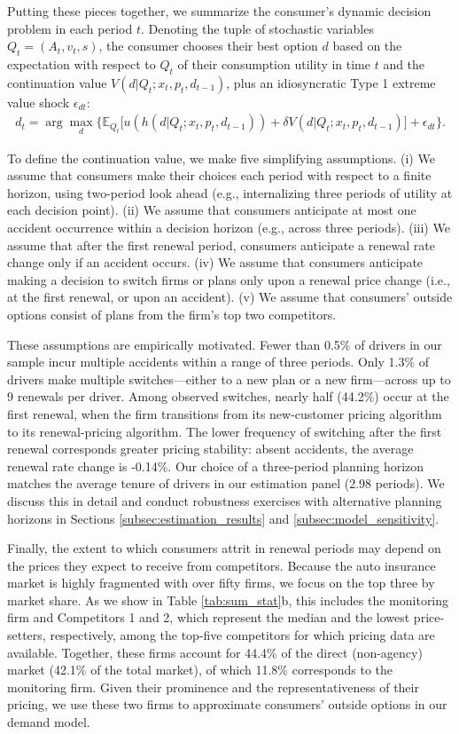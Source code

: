 Putting these pieces together, we summarize the consumer's dynamic decision problem in each period $t$. Denoting the tuple of stochastic variables $Q_t = (A_t, v_t, s)$, the consumer chooses their best option $d$ based on the expectation with respect to $Q_t$ of their consumption utility in time $t$ and the continuation value $V(d | Q_t; x_t, p_t, d_{t-1} )$, plus an idiosyncratic Type 1 extreme value shock $\epsilon_{dt}$:
%
\begin{align}\label{eq:dynamic_decision_model}
d_{t} =  \arg\max_{d}\Big\{\mathbb{E}_{Q_{t}}\Big[u(h(d|Q_t; x_t, p_t, d_{t-1})) + \delta V(d|Q_t; x_t, p_t, d_{t-1})\Big] + \epsilon_{dt}\Big\}.
\end{align}

To define the continuation value, we make five simplifying assumptions. (i)  We assume that consumers make their choices each period with respect to a finite horizon, using two-period look ahead (e.g., internalizing three periods of utility at each decision point). (ii) We assume that consumers anticipate at most one accident occurrence within a decision horizon (e.g., across three periods). (iii) We assume that after the first renewal period, consumers anticipate a renewal rate change only if an accident occurs. (iv) We assume that consumers anticipate making a decision to switch firms or plans only upon a renewal price change (i.e., at the first renewal, or upon an accident). (v) We assume that consumers' outside options consist of plans from the firm's top two competitors.

These assumptions are empirically motivated.
Fewer than 0.5\% of drivers in our sample incur multiple accidents within a range of three periods. Only 1.3\% of drivers make multiple switches---either to a new plan or a new firm---across up to 9 renewals per driver. Among observed switches, nearly half (44.2\%)  occur at the first renewal, when the firm transitions from its new-customer pricing algorithm to its renewal-pricing algorithm. The lower frequency of switching after the first renewal corresponds greater pricing stability: absent accidents, the average renewal rate change is -0.14\%.
Our choice
of a three-period planning horizon matches the average tenure of drivers in our estimation panel (2.98 periods). We discuss this in detail and conduct robustness exercises with alternative planning horizons in Sections \ref{subsec:estimation_results} and \ref{subsec:model_sensitivity}.

Finally, the extent to which consumers attrit in renewal periods may depend on the prices they expect to receive from competitors.
Because the auto insurance market is highly fragmented with over fifty firms, we focus on the top three by market share. As we show in Table \ref{tab:sum_stat}b, this includes the monitoring firm and Competitors 1 and 2, which represent the median and the lowest price-setters, respectively, among the top-five competitors for which pricing data are available. Together, these firms account for 44.4\% of the direct (non-agency) market (42.1\% of the total market), of which 11.8\% corresponds to the monitoring firm.
Given their prominence and the representativeness of their pricing, we use these two firms to approximate consumers' outside options in our demand model.

